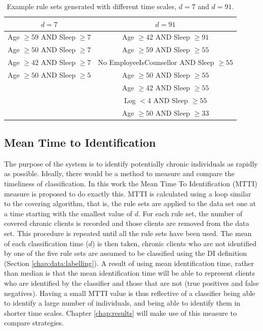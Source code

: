 \begin{table}[h]
	\centering

	\begin{tabular}{cc}
	\toprule
	$d=7$ & $d=91$ \\
	\midrule
	Age $\geq 59$ AND Sleep $\geq 7$ & Age $\geq 42$ AND Sleep $\geq 91$ \\
	Age $\geq 50$ AND Sleep $\geq 7$ & Age $\geq 59$ AND Sleep $\geq 55$ \\
	Age $\geq 42$ AND Sleep $\geq 7$ & No EmployeeIsCounsellor AND Sleep $\geq 55$ \\
	Age $\geq 50$ AND Sleep $\geq 5$ & Age $\geq 50$ AND Sleep $\geq 55$ \\
																	 & Age $\geq 42$ AND Sleep $\geq 55$ \\
																	 & Log $< 4$ AND Sleep $\geq 55$ \\
																	 & Age $\geq 50$ AND Sleep $\geq 33$ \\

	\bottomrule
	\end{tabular}

	\caption{Example rule sets generated with different time scales, $d=7$ and $d=91$.}
	\label{tbl:algo:exampledays}
\end{table}

\subsection{Mean Time to Identification} \label{chap:algo:mtti}

The purpose of the \Abb system is to identify potentially chronic individuals as rapidly as possible. Ideally, there would be a method to measure and compare the timeliness of classification. In this work the Mean Time To Identification (MTTI) measure is proposed to do exactly this. MTTI is calculated using a loop similar to the covering algorithm, that is, the rule sets are applied to the data set one at a time starting with the smallest value of $d$. For each rule set, the number of covered chronic clients is recorded and those clients are removed from the data set. This procedure is repeated until all the rule sets have been used.
The mean of each classification time ($d$) is then taken, chronic clients who are not identified by one of the five rule sets are assumed to be classified using the DI definition (Section \ref{chap:data:labelling}). A result of using mean identification time, rather than median is that the mean identification time will be able to represent clients who are identified by the classifier and those that are not (true positives and false negatives). Having a small MTTI value is thus reflective of a classifier being able to identify a large number of individuals, and being able to identify them in shorter time scales. Chapter \ref{chap:results} will make use of this measure to compare \Abb strategies.

